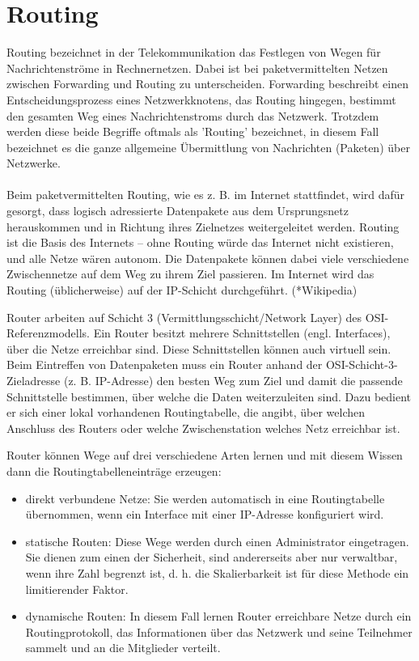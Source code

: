 \chapter{Routing}

Routing bezeichnet in der Telekommunikation das Festlegen von Wegen für Nachrichtenströme in Rechnernetzen. Dabei ist bei paketvermittelten Netzen zwischen Forwarding und Routing zu unterscheiden. Forwarding beschreibt einen Entscheidungsprozess eines Netzwerkknotens, das Routing hingegen, bestimmt den gesamten Weg eines Nachrichtenstroms durch das Netzwerk. Trotzdem werden diese beide Begriffe oftmals als 'Routing' bezeichnet, in diesem Fall bezeichnet es die ganze allgemeine Übermittlung von Nachrichten (Paketen) über Netzwerke.\\\\
Beim paketvermittelten Routing, wie es z. B. im Internet stattfindet, wird dafür gesorgt, dass logisch adressierte Datenpakete aus dem Ursprungsnetz herauskommen und in Richtung ihres Zielnetzes weitergeleitet werden. Routing ist die Basis des Internets – ohne Routing würde das Internet nicht existieren, und alle Netze wären autonom. Die Datenpakete können dabei viele verschiedene Zwischennetze auf dem Weg zu ihrem Ziel passieren. Im Internet wird das Routing (üblicherweise) auf der IP-Schicht durchgeführt. (*Wikipedia)

Router arbeiten auf Schicht 3 (Vermittlungsschicht/Network Layer) des OSI-Referenzmodells. Ein Router besitzt mehrere Schnittstellen (engl. Interfaces), über die Netze erreichbar sind. Diese Schnittstellen können auch virtuell sein. Beim Eintreffen von Datenpaketen muss ein Router anhand der OSI-Schicht-3-Zieladresse (z. B. IP-Adresse) den besten Weg zum Ziel und damit die passende Schnittstelle bestimmen, über welche die Daten weiterzuleiten sind. Dazu bedient er sich einer lokal vorhandenen Routingtabelle, die angibt, über welchen Anschluss des Routers oder welche Zwischenstation welches Netz erreichbar ist.

Router können Wege auf drei verschiedene Arten lernen und mit diesem Wissen dann die Routingtabelleneinträge erzeugen:

\begin{itemize}
\item direkt verbundene Netze: Sie werden automatisch in eine Routingtabelle übernommen, wenn ein Interface mit einer IP-Adresse konfiguriert wird.
\item statische Routen: Diese Wege werden durch einen Administrator eingetragen. Sie dienen zum einen der Sicherheit, sind andererseits aber nur verwaltbar, wenn ihre Zahl begrenzt ist, d. h. die Skalierbarkeit ist für diese Methode ein limitierender Faktor.
\item dynamische Routen: In diesem Fall lernen Router erreichbare Netze durch ein Routingprotokoll, das Informationen über das Netzwerk und seine Teilnehmer sammelt und an die Mitglieder verteilt.
\end{itemize}

